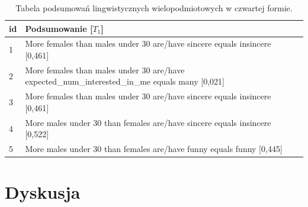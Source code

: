 \documentclass{classrep}
\begin{document}
\begin{center}
  \begin{table}[H]
    \begin{tabularx}{\textwidth}{lXc}
    
    id & Podsumowanie [$T_1$] \\ \hline 
  
    1 & More females than males under 30 are/have sincere equals insincere [0,461] \\\hline
    2 & More females than males under 30 are/have expected\_num\_interested\_in\_me equals many [0,021] \\  \hline
    3 & More females than males under 30 are/have sincere equals insincere [0,461]\\ \hline
    4 & More males under 30 than females are/have sincere equals insincere [0,522]\\ \hline
    5 & More males under 30 than females are/have funny equals funny [0,445]\\ \hline
  \end{tabularx}
  \caption{Tabela podsumowań lingwistycznych wielopodmiotowych w czwartej formie.}
\end{table}
\end{center}





% 
% 
% 

\section{Dyskusja}
\end{document}
